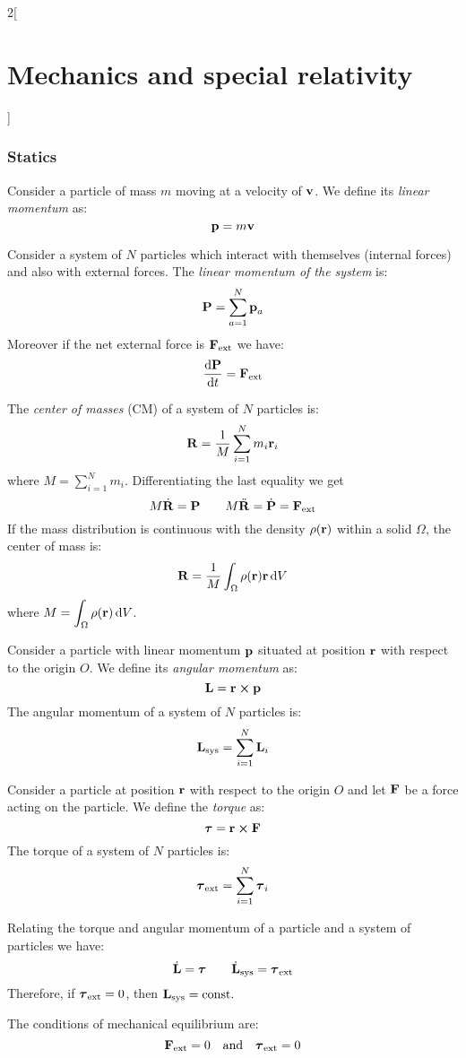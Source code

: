 \documentclass[../../../main_physics.tex]{subfiles}
\begin{document}
\begin{multicols}{2}[\section{Mechanics and special relativity}]
  \subsubsection{Statics}
  \begin{definition}
    Consider a particle of mass $m$ moving at a velocity of $\boldsymbol{\mathrm{v}}$. We define its \emph{linear momentum} as:
    $$\boldsymbol{\mathrm{p}}=m\boldsymbol{\mathrm{v}}$$
  \end{definition}
  \begin{proposition}
    Consider a system of $N$ particles which interact with themselves (internal forces) and also with external forces. The \emph{linear momentum of the system} is: $$\boldsymbol{\mathrm{P}}=\sum_{a=1}^N\boldsymbol{\mathrm{p}}_a$$ Moreover if the net external force is $\boldsymbol{\mathrm{F}}_\text{ext}$ we have:
    $$\dv{\boldsymbol{\mathrm{P}}}{t}=\boldsymbol{\mathrm{F}}_\text{ext}$$
  \end{proposition}
  \begin{proposition}
    The \emph{center of masses} (CM) of a system of $N$ particles is: $$\boldsymbol{\mathrm{R}}=\frac{1}{M}\sum_{i=1}^Nm_i\boldsymbol{\mathrm{r}}_i$$ where $\displaystyle M=\sum_{i=1}^Nm_i$. Differentiating the last equality we get
    $$M\dot{\boldsymbol{\mathrm{R}}}=\boldsymbol{\mathrm{P}}\qquad M\ddot{\boldsymbol{\mathrm{R}}}=\dot{\boldsymbol{\mathrm{P}}}=\boldsymbol{\mathrm{F}}_\text{ext}$$
    If the mass distribution is continuous with the density $\rho(\boldsymbol{\mathrm{r}})$ within a solid $\Omega$, the center of mass is: $$\boldsymbol{\mathrm{R}}=\frac{1}{M}\int_\Omega\rho(\boldsymbol{\mathrm{r}})\boldsymbol{\mathrm{r}}\dd{V}$$ where $\displaystyle M=\int_\Omega\rho(\boldsymbol{\mathrm{r}})\dd{V}$.
  \end{proposition}
  \begin{proposition}
    Consider a particle with linear momentum $\boldsymbol{\mathrm{p}}$ situated at position $\boldsymbol{\mathrm{r}}$ with respect to the origin $O$. We define its \emph{angular momentum} as: $$\vf{L}=\vf{r}\crossprod\vf{p}$$ The angular momentum of a system of $N$ particles is: $$\boldsymbol{\mathrm{L}}_\text{sys}=\sum_{i=1}^N\boldsymbol{\mathrm{L}}_i$$
  \end{proposition}
  \begin{proposition}[Torque]
    Consider a particle at position $\boldsymbol{\mathrm{r}}$ with respect to the origin $O$ and let $\boldsymbol{\mathrm{F}}$ be a force acting on the particle. We define the \emph{torque} as: $$\vf{\tau}=\vf{r}\crossprod\vf{F}$$ The torque of a system of $N$ particles is: $$\boldsymbol{\mathrm{\tau}}_\text{ext}=\sum_{i=1}^N\boldsymbol{\mathrm{\tau}}_i$$
  \end{proposition}
  \begin{proposition}
    Relating the torque and angular momentum of a particle and a system of particles we have:
    $$\dot{\boldsymbol{\mathrm{L}}}=\boldsymbol{\mathrm{\tau}}\qquad\dot{\boldsymbol{\mathrm{L}}}_\text{sys}=\boldsymbol{\mathrm{\tau}}_\text{ext}$$ Therefore, if $\boldsymbol{\mathrm{\tau}}_\text{ext}=0$, then $\boldsymbol{\mathrm{L}}_\text{sys}=\text{const}.$
  \end{proposition}
  \begin{definition}
    The conditions of mechanical equilibrium are: $$\boldsymbol{\mathrm{F}}_\text{ext}=0\quad\text{and}\quad\boldsymbol{\mathrm{\tau}}_\text{ext}=0$$
  \end{definition}

\end{multicols}
\end{document}
